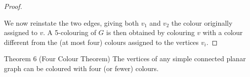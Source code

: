 \begin{proof}
\begin{center}
\end{center}

We now reinstate the two edges, giving both $v_1$ and $v_2$ the colour originally assigned to $v$. A 5-colouring of $G$ is then obtained by colouring $v$ with a colour different from the (at most four) colours assigned to the vertices $v_i$.
\end{proof}

\begin{thmbox}{Theorem 6 (Four Colour Theorem)}
The vertices of any simple connected planar graph can be coloured with four (or fewer) colours.
\end{thmbox}

